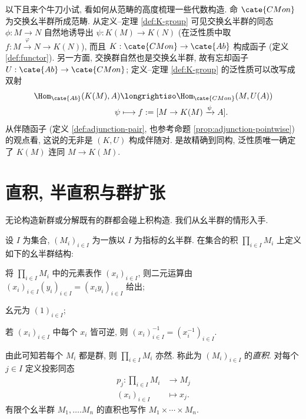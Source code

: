 以下且来个牛刀小试, 看如何从范畴的高度梳理一些代数构造. 命 $\cate{CMon}$ 为交换幺半群所成范畴. 从定义--定理 \ref{def:K-group} 可见交换幺半群的同态 $\phi: M \to N$ 自然地诱导出 $\psi: K(M) \to K(N)$ (在泛性质中取 $f: M \xrightarrow{\varphi} N \to K(N)$), 而且 $K: \cate{CMon} \to \cate{Ab}$ 构成函子 (定义 \ref{def:functor}). 另一方面, 交换群自然也是交换幺半群, 故有忘却函子 $U: \cate{Ab} \to \cate{CMon}$; 定义--定理 \ref{def:K-group} 的泛性质可以改写成双射
\begin{align*}
	\Hom_{\cate{Ab}}(K(M), A) & \longrightiso \Hom_{\cate{CMon}}(M, U(A)) \\
	\psi & \longmapsto f := [M \to K(M) \xrightarrow{\psi} A].
\end{align*}
从伴随函子 (定义 \ref{def:adjunction-pair}, 也参考命题 \ref{prop:adjunction-pointwise}) 的观点看, 这说的无非是 $(K, U)$ 构成伴随对. 是故精确到同构, 泛性质唯一确定了 $K(M)$ 连同 $M \to K(M)$.

\section{直积, 半直积与群扩张}\label{sec:group-extensions}
无论构造新群或分解既有的群都会碰上积构造. 我们从幺半群的情形入手.

\begin{definition}[幺半群的直积]\label{def:monoid-times}
	设 $I$ 为集合, $(M_i)_{i \in I}$ 为一族以 $I$ 为指标的幺半群. 在集合的积 $\prod_{i \in I} M_i$ 上定义如下的幺半群结构:
	\begin{compactitem}
		\item 将 $\prod_{i \in I} M_i$ 中的元素表作 $(x_i)_{i \in I}$, 则二元运算由 $(x_i)_{i \in I} (y_i)_{i \in I} = (x_i y_i)_{i \in I}$ 给出;
		\item 幺元为 $(1)_{i \in I}$;
		\item 若 $(x_i)_{i \in I}$ 中每个 $x_i$ 皆可逆, 则 $(x_i)_{i \in I}^{-1} = (x_i^{-1})_{i \in I}$.
	\end{compactitem}
	由此可知若每个 $M_i$ 都是群, 则 $\prod_{i \in I} M_i$ 亦然. 称此为 $(M_i)_{i \in I}$ 的\emph{直积}. 对每个 $j \in I$ 定义投影同态
	\begin{align*}
		p_j: \prod_{i \in I} M_i & \longrightarrow M_j \\
		(x_i)_{i \in I} & \longmapsto x_j.
	\end{align*}
	有限个幺半群 $M_1, \ldots. M_n$ 的直积也写作 $M_1 \times \cdots \times M_n$.
\end{definition}

